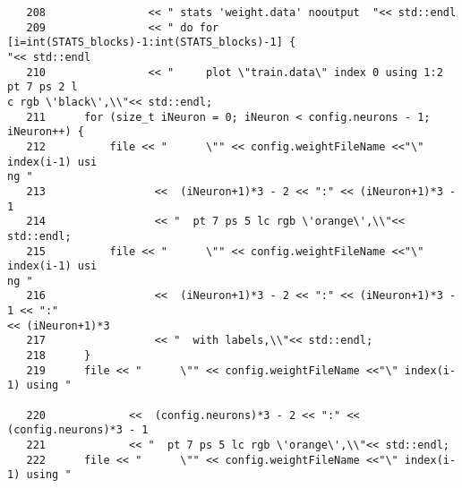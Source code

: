 \begin{verbatim}
   208	              << " stats 'weight.data' nooutput  "<< std::endl
   209	              << " do for [i=int(STATS_blocks)-1:int(STATS_blocks)-1] { 
"<< std::endl
   210	              << "     plot \"train.data\" index 0 using 1:2 pt 7 ps 2 l
c rgb \'black\',\\"<< std::endl;
   211	    for (size_t iNeuron = 0; iNeuron < config.neurons - 1; iNeuron++) {
   212	        file << "      \"" << config.weightFileName <<"\" index(i-1) usi
ng " 
   213	               <<  (iNeuron+1)*3 - 2 << ":" << (iNeuron+1)*3 - 1
   214	               << "  pt 7 ps 5 lc rgb \'orange\',\\"<< std::endl;
   215	        file << "      \"" << config.weightFileName <<"\" index(i-1) usi
ng " 
   216	               <<  (iNeuron+1)*3 - 2 << ":" << (iNeuron+1)*3 - 1 << ":" 
<< (iNeuron+1)*3
   217	               << "  with labels,\\"<< std::endl;
   218	    }
   219	    file << "      \"" << config.weightFileName <<"\" index(i-1) using "
 
   220	           <<  (config.neurons)*3 - 2 << ":" << (config.neurons)*3 - 1
   221	           << "  pt 7 ps 5 lc rgb \'orange\',\\"<< std::endl;
   222	    file << "      \"" << config.weightFileName <<"\" index(i-1) using "
 

\end{verbatim}

